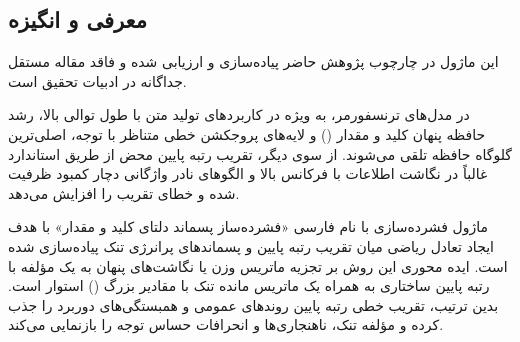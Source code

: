 \subsection{معرفی و انگیزه}
این ماژول در چارچوب پژوهش حاضر پیاده‌سازی و ارزیابی شده و فاقد مقاله مستقل جداگانه در ادبیات تحقیق است.

در مدل‌های ترنسفورمر، به ویژه در کاربردهای تولید متن با طول توالی بالا، رشد حافظه پنهان کلید و مقدار () و لایه‌های پروجکشن خطی متناظر با توجه، اصلی‌ترین گلوگاه حافظه تلقی می‌شوند. از سوی دیگر، تقریب رتبه پایین محض از طریق  استاندارد غالباً در نگاشت اطلاعات با فرکانس بالا و الگوهای نادر واژگانی دچار کمبود ظرفیت شده و خطای تقریب را افزایش می‌دهد.

ماژول فشرده‌سازی  با نام فارسی «فشرده‌ساز پسماند دلتای کلید و مقدار» با هدف ایجاد تعادل ریاضی میان تقریب رتبه پایین و پسماندهای پرانرژی تنک پیاده‌سازی شده است. ایده محوری این روش بر تجزیه ماتریس وزن یا نگاشت‌های پنهان به یک مؤلفه با رتبه پایین ساختاری به همراه یک ماتریس مانده تنک با مقادیر بزرگ () استوار است. بدین ترتیب، تقریب خطی رتبه پایین روندهای عمومی و همبستگی‌های دوربرد را جذب کرده و مؤلفه تنک، ناهنجاری‌ها و انحرافات حساس توجه را بازنمایی می‌کند.
